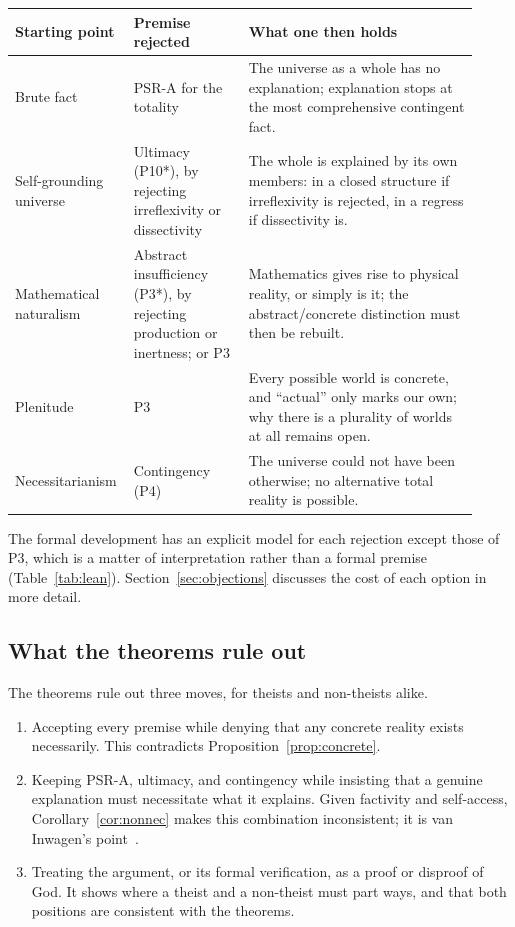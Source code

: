 \documentclass[11pt,letterpaper]{article}
\theoremstyle{plain}
\theoremstyle{definition}
\begin{document}
\begin{center}
\renewcommand{\arraystretch}{1.2}
\begin{tabular}{@{}L{0.2\linewidth}L{0.24\linewidth}L{0.48\linewidth}@{}}
\toprule
\textbf{Starting point} & \textbf{Premise rejected} & \textbf{What one then holds} \\
\midrule
Brute fact & PSR-A for the totality & The universe as a whole has no explanation; explanation stops at the most comprehensive contingent fact. \\
Self-grounding universe & Ultimacy (P10*), by rejecting irreflexivity or dissectivity & The whole is explained by its own members: in a closed structure if irreflexivity is rejected, in a regress if dissectivity is. \\
Mathematical naturalism & Abstract insufficiency (P3*), by rejecting production or inertness; or P3 & Mathematics gives rise to physical reality, or simply is it; the abstract/concrete distinction must then be rebuilt. \\
Plenitude & P3 & Every possible world is concrete, and ``actual'' only marks our own; why there is a plurality of worlds at all remains open. \\
Necessitarianism & Contingency (P4) & The universe could not have been otherwise; no alternative total reality is possible. \\
\bottomrule
\end{tabular}
\end{center}

The formal development has an explicit model for each rejection except those of P3, which is a matter of interpretation rather than a formal premise (Table~\ref{tab:lean}). Section~\ref{sec:objections} discusses the cost of each option in more detail.

\subsection{What the theorems rule out}

The theorems rule out three moves, for theists and non-theists alike.
\begin{enumerate}[label=(\alph*)]
  \item Accepting every premise while denying that any concrete reality exists necessarily. This contradicts Proposition~\ref{prop:concrete}.
  \item Keeping PSR-A, ultimacy, and contingency while insisting that a genuine explanation must necessitate what it explains. Given factivity and self-access, Corollary~\ref{cor:nonnec} makes this combination inconsistent; it is van Inwagen's point~\cite{vaninwagen}.
  \item Treating the argument, or its formal verification, as a proof or disproof of God. It shows where a theist and a non-theist must part ways, and that both positions are consistent with the theorems.
\end{enumerate}
\end{document}
